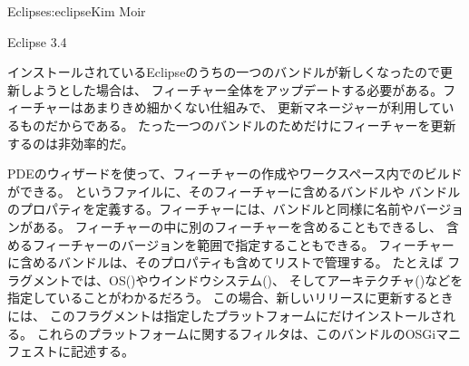 \begin{aosachapter}{Eclipse}{s:eclipse}{Kim Moir}
\begin{aosasect1}{Eclipse 3.4}

インストールされているEclipseのうちの一つのバンドルが新しくなったので更新しようとした場合は、
フィーチャー全体をアップデートする必要がある。フィーチャーはあまりきめ細かくない仕組みで、
更新マネージャーが利用しているものだからである。
たった一つのバンドルのためだけにフィーチャーを更新するのは非効率的だ。

PDEのウィザードを使って、フィーチャーの作成やワークスペース内でのビルドができる。
というファイルに、そのフィーチャーに含めるバンドルや
バンドルのプロパティを定義する。フィーチャーには、バンドルと同様に名前やバージョンがある。
フィーチャーの中に別のフィーチャーを含めることもできるし、
含めるフィーチャーのバージョンを範囲で指定することもできる。
フィーチャーに含めるバンドルは、そのプロパティも含めてリストで管理する。
たとえば
フラグメントでは、OS()やウインドウシステム()、
そしてアーキテクチャ()などを指定していることがわかるだろう。
この場合、新しいリリースに更新するときには、
このフラグメントは指定したプラットフォームにだけインストールされる。
これらのプラットフォームに関するフィルタは、このバンドルのOSGiマニフェストに記述する。


\end{aosasect1}
\end{aosachapter}

